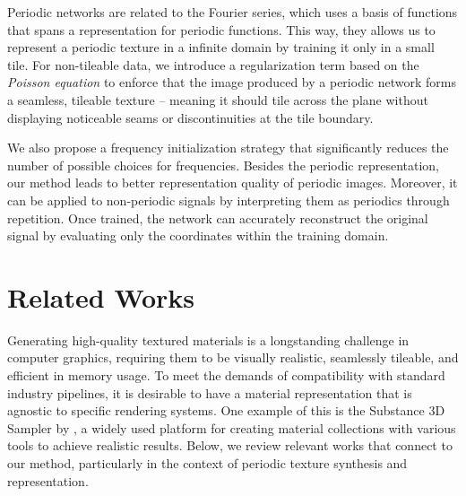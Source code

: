 Periodic networks are related to the Fourier series, which uses a basis of functions that spans a representation for periodic functions. This way, they allows us to represent a periodic texture in a infinite domain by training it only in a small tile. For non-tileable data, we introduce a regularization term based on the \textit{Poisson equation} to enforce that the image produced by a periodic network forms a seamless, tileable texture -- meaning it should tile across the plane without displaying noticeable seams or discontinuities at the tile boundary. 

We also propose a frequency initialization strategy that significantly reduces the number of possible choices for frequencies. Besides the periodic representation, our method leads to better representation quality of periodic images. Moreover, it can be applied to non-periodic signals by interpreting them as periodics through repetition. Once trained, the network can accurately reconstruct the original signal by evaluating only the coordinates within the training domain.

\section{Related Works}

Generating high-quality textured materials is a longstanding challenge in computer graphics, requiring them to be visually realistic, seamlessly tileable, and efficient in memory usage. To meet the demands of compatibility with standard industry pipelines, it is desirable to have a material representation that is agnostic to specific rendering systems. One example of this is the Substance 3D Sampler by \citet{substance_sampler}, a widely used platform for creating material collections with various tools to achieve realistic results. Below, we review relevant works that connect to our method, particularly in the context of periodic texture synthesis and representation.



